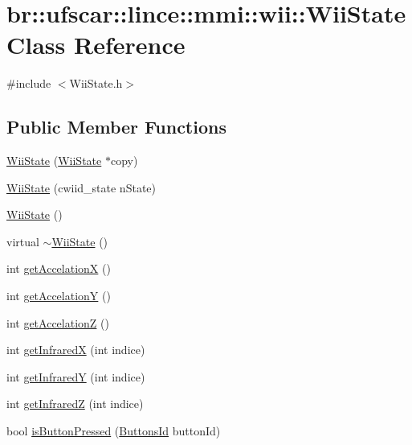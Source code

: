 \hypertarget{classbr_1_1ufscar_1_1lince_1_1mmi_1_1wii_1_1WiiState}{
\section{br::ufscar::lince::mmi::wii::WiiState Class Reference}
\label{classbr_1_1ufscar_1_1lince_1_1mmi_1_1wii_1_1WiiState}
}


{\ttfamily \#include $<$WiiState.h$>$}

\subsection*{Public Member Functions}
\begin{DoxyCompactItemize}
\item 
\hyperlink{classbr_1_1ufscar_1_1lince_1_1mmi_1_1wii_1_1WiiState_a495f2533098a39cab292f4c090f586fc}{WiiState} (\hyperlink{classbr_1_1ufscar_1_1lince_1_1mmi_1_1wii_1_1WiiState}{WiiState} $\ast$copy)
\item 
\hyperlink{classbr_1_1ufscar_1_1lince_1_1mmi_1_1wii_1_1WiiState_a3dcbaf91a80e3638a097c09078776ba0}{WiiState} (cwiid\_\-state nState)
\item 
\hyperlink{classbr_1_1ufscar_1_1lince_1_1mmi_1_1wii_1_1WiiState_aee16d063fff49e2c05d082cc6721b734}{WiiState} ()
\item 
virtual \hyperlink{classbr_1_1ufscar_1_1lince_1_1mmi_1_1wii_1_1WiiState_a423fdf6e3a03b1094222904c2d513fe0}{$\sim$WiiState} ()
\item 
int \hyperlink{classbr_1_1ufscar_1_1lince_1_1mmi_1_1wii_1_1WiiState_a810ac88c28882835d37992ab92f01a33}{getAccelationX} ()
\item 
int \hyperlink{classbr_1_1ufscar_1_1lince_1_1mmi_1_1wii_1_1WiiState_a9ee5ea0eeca848732d1f76f9ddfc30b4}{getAccelationY} ()
\item 
int \hyperlink{classbr_1_1ufscar_1_1lince_1_1mmi_1_1wii_1_1WiiState_a133cbbc743340aa7969a7c553b6b2897}{getAccelationZ} ()
\item 
int \hyperlink{classbr_1_1ufscar_1_1lince_1_1mmi_1_1wii_1_1WiiState_a0868c5c47e73e7935310b1365a506a95}{getInfraredX} (int indice)
\item 
int \hyperlink{classbr_1_1ufscar_1_1lince_1_1mmi_1_1wii_1_1WiiState_a7bba650d1a0d183d586346512ce05d59}{getInfraredY} (int indice)
\item 
int \hyperlink{classbr_1_1ufscar_1_1lince_1_1mmi_1_1wii_1_1WiiState_a035fcde30816f5c1f834620ed86c91ff}{getInfraredZ} (int indice)
\item 
bool \hyperlink{classbr_1_1ufscar_1_1lince_1_1mmi_1_1wii_1_1WiiState_ac62f1927a8a9e9b73fa26b426dd34fa0}{isButtonPressed} (\hyperlink{namespacebr_1_1ufscar_1_1lince_1_1mmi_1_1wii_a0e81979403fad07b3bbbe516de9e22e8}{ButtonsId} buttonId)
\end{DoxyCompactItemize}


